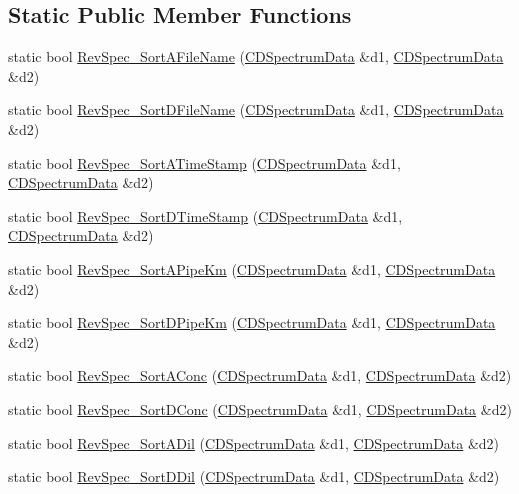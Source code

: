 \subsection*{Static Public Member Functions}
\begin{DoxyCompactItemize}
\item 
static bool \hyperlink{classCSpectrometer_acf5e9dbbc7f576f010cf2d56917ee990}{RevSpec\_\-SortAFileName} (\hyperlink{classCDSpectrumData}{CDSpectrumData} \&d1, \hyperlink{classCDSpectrumData}{CDSpectrumData} \&d2)
\item 
static bool \hyperlink{classCSpectrometer_aba3cd899b5c2d40322fdb60ba277e0f9}{RevSpec\_\-SortDFileName} (\hyperlink{classCDSpectrumData}{CDSpectrumData} \&d1, \hyperlink{classCDSpectrumData}{CDSpectrumData} \&d2)
\item 
static bool \hyperlink{classCSpectrometer_affbbd72ce840ba281f1acc3c7dd3d972}{RevSpec\_\-SortATimeStamp} (\hyperlink{classCDSpectrumData}{CDSpectrumData} \&d1, \hyperlink{classCDSpectrumData}{CDSpectrumData} \&d2)
\item 
static bool \hyperlink{classCSpectrometer_a26aa48f84c66ef0aa0eeef55a9b5fb78}{RevSpec\_\-SortDTimeStamp} (\hyperlink{classCDSpectrumData}{CDSpectrumData} \&d1, \hyperlink{classCDSpectrumData}{CDSpectrumData} \&d2)
\item 
static bool \hyperlink{classCSpectrometer_a3a99ffd9cd6194380842f9bc186c2ee1}{RevSpec\_\-SortAPipeKm} (\hyperlink{classCDSpectrumData}{CDSpectrumData} \&d1, \hyperlink{classCDSpectrumData}{CDSpectrumData} \&d2)
\item 
static bool \hyperlink{classCSpectrometer_a5ca4588182f4cc631df977e7c4239559}{RevSpec\_\-SortDPipeKm} (\hyperlink{classCDSpectrumData}{CDSpectrumData} \&d1, \hyperlink{classCDSpectrumData}{CDSpectrumData} \&d2)
\item 
static bool \hyperlink{classCSpectrometer_a3b176796b61740d7be8fd145e364f8a7}{RevSpec\_\-SortAConc} (\hyperlink{classCDSpectrumData}{CDSpectrumData} \&d1, \hyperlink{classCDSpectrumData}{CDSpectrumData} \&d2)
\item 
static bool \hyperlink{classCSpectrometer_aec524c4fbb161f50c925f660daa848d3}{RevSpec\_\-SortDConc} (\hyperlink{classCDSpectrumData}{CDSpectrumData} \&d1, \hyperlink{classCDSpectrumData}{CDSpectrumData} \&d2)
\item 
static bool \hyperlink{classCSpectrometer_a5dd3f3a9e14793e4f02cb4182a6a2ddf}{RevSpec\_\-SortADil} (\hyperlink{classCDSpectrumData}{CDSpectrumData} \&d1, \hyperlink{classCDSpectrumData}{CDSpectrumData} \&d2)
\item 
static bool \hyperlink{classCSpectrometer_af952347266c3766eec0b8e2b7e864409}{RevSpec\_\-SortDDil} (\hyperlink{classCDSpectrumData}{CDSpectrumData} \&d1, \hyperlink{classCDSpectrumData}{CDSpectrumData} \&d2)
\end{DoxyCompactItemize}
